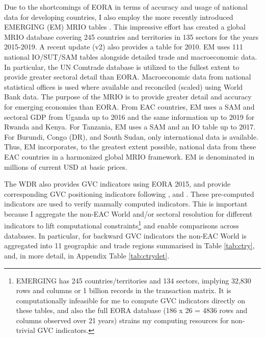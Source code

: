 \documentclass[a4paper]{article}
\begin{document}
Due to the shortcomings of EORA in terms of accuracy and usage of national data for developing countries, I also employ the more recently introduced EMERGING (EM) MRIO tables \citep{huo2022full}. This impressive effort has created a global MRIO database covering 245 countries and territories in 135 sectors for the years 2015-2019. A recent update (v2) also provides a table for 2010. EM uses 111 national IO/SUT/SAM tables alongside detailed trade and macroeconomic data. In particular, the UN Comtrade database is utilized to the fullest extent to provide greater sectoral detail than EORA. Macroeconomic data from national statistical offices is used where available and reconciled (scaled) using World Bank data. The purpose of the MRIO is to provide greater detail and accuracy for emerging economies than EORA. From EAC countries, EM uses a SAM and sectoral GDP from Uganda up to 2016 and the same information up to 2019 for Rwanda and Kenya. For Tanzania, EM uses a SAM and an IO table up to 2017. For Burundi, Congo (DR), and South Sudan, only international data is available. Thus, EM incorporates, to the greatest extent possible, national data from these EAC countries in a harmonized global MRIO framework. EM is denominated in millions of current USD at basic prices. \newline

The WDR also provides GVC indicators using EORA 2015, and \citet{mancini2023positioning} provide corresponding GVC positioning indicators following \citet{fally2012production}, \citet{antras2012measuring} and \citet{antras2013organizing, antras2018measurement}. These pre-computed indicators are used to verify manually computed indicators. This is important because I aggregate the non-EAC World and/or sectoral resolution for different indicators to lift computational constraints\footnote{EMERGING has 245 countries/territories and 134 sectors, implying 32,830 rows and columns or 1 billion records in the transaction matrix. It is computationally infeasible for me to compute GVC indicators directly on these tables, and also the full EORA database (186 x 26 = 4836 rows and columns observed over 21 years) strains my computing resources for non-trivial GVC indicators.} and enable comparisons across databases. In particular, for backward GVC indicators the non-EAC World is aggregated into 11 geographic and trade regions summarised in Table \ref{tab:ctry}, and, in more detail, in Appendix Table \ref{tab:ctrydet}. 
\end{document}

